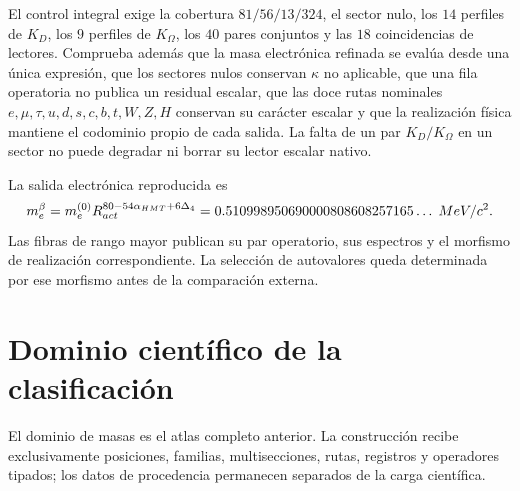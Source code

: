 El control integral exige la cobertura \(81/56/13/324\), el sector nulo, los
\(14\) perfiles de \(K_D\), los \(9\) perfiles de \(K_\Omega\), los
\(40\) pares conjuntos y las \(18\) coincidencias de lectores. Comprueba
además que la masa electrónica refinada se evalúa desde una única expresión,
que los sectores nulos conservan \(\kappa\) no aplicable, que una fila
operatoria no publica un residual escalar, que las doce rutas nominales
\(e,\mu,\tau,u,d,s,c,b,t,W,Z,H\) conservan su carácter escalar y que la
realización física mantiene el codominio propio de cada salida. La falta de un par
\(K_D/K_\Omega\) en un sector no puede degradar ni borrar su lector escalar
nativo.

La salida electrónica reproducida es
\[
m_e^\beta
=m_e^{(0)}R_{\rm act}^{80-54\alpha_{\rm HMT}+6\Delta_4}
=0.510998950690000808608257165\ldots\;\mathrm{MeV}/c^2.
\]
Las fibras de rango mayor publican su par operatorio, sus espectros y el
morfismo de realización correspondiente. La selección de autovalores queda
determinada por ese morfismo antes de la comparación externa.

\enlargethispage{6\baselineskip}
\section{Dominio científico de la clasificación}
\label{sec:alcance-publico-apendices-acumulativo}

El dominio de masas es el atlas completo anterior. La construcción recibe
exclusivamente posiciones, familias, multisecciones, rutas, registros y
operadores tipados; los datos de procedencia permanecen separados de la carga
científica.
